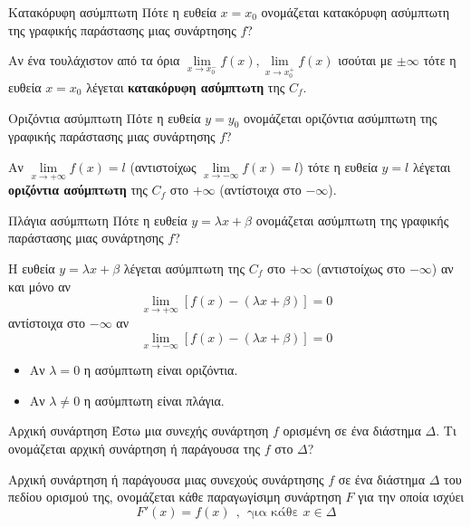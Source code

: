 \begin{Orismosbox}{Κατακόρυφη ασύμπτωτη}
\label{orismos:katakoryfh_asymptwth}
Πότε η ευθεία $x=x_0$ ονομάζεται κατακόρυφη ασύμπτωτη της γραφικής παράστασης μιας συνάρτησης $f$?
\end{Orismosbox}
\apanthsh
Αν ένα τουλάχιστον από τα όρια $ \lim\limits_{x\to x_0^-}{f(x)},\lim\limits_{x\to x_0^+}{f(x)} $ ισούται με $ \pm\infty $ τότε η ευθεία $ x=x_0 $ λέγεται \textbf{κατακόρυφη ασύμπτωτη} της $ C_f $.
\begin{Orismosbox}{Οριζόντια ασύμπτωτη}
\label{orismos:orizontia_asymptwth}
Πότε η ευθεία $y=y_0$ ονομάζεται οριζόντια ασύμπτωτη της γραφικής παράστασης μιας συνάρτησης $f$?
\end{Orismosbox}
\apanthsh
Αν $ \lim\limits_{x\to +\infty}{f(x)}=l $ (αντιστοίχως $ \lim\limits_{x\to -\infty}{f(x)}=l $) τότε η ευθεία $ y=l $ λέγεται \textbf{οριζόντια ασύμπτωτη} της $ C_f $ στο $ +\infty $ (αντίστοιχα στο $ -\infty $).
\begin{Orismosbox}{Πλάγια ασύμπτωτη}
\label{orismos:plagia_asymptwth}
Πότε η ευθεία $y=\lambda x+\beta$ ονομάζεται ασύμπτωτη της γραφικής παράστασης μιας συνάρτησης $f$?
\end{Orismosbox}
\apanthsh
Η ευθεία $ y=\lambda x+\beta $ λέγεται ασύμπτωτη της $ C_f $ στο $ +\infty $ (αντιστοίχως στο $ -\infty $) αν και μόνο αν
\[ \lim\limits_{x\to +\infty}{[f(x)-(\lambda x+\beta)]=0} \]
αντίστοιχα στο $ -\infty $ αν 
\[ \lim_{x\to -\infty}{[f(x)-(\lambda x+\beta)]=0} \]
\begin{itemize}[itemsep=0mm]
\item Αν $ \lambda=0 $ η ασύμπτωτη είναι οριζόντια.
\item Αν $ \lambda\neq 0 $ η ασύμπτωτη είναι πλάγια.
\end{itemize}
\begin{Orismosbox}{Αρχική συνάρτηση}
\label{orismos:arxikh_synarthsh}
Έστω μια συνεχής συνάρτηση $f$ ορισμένη σε ένα διάστημα $\Delta$. Τι ονομάζεται αρχική συνάρτηση ή παράγουσα της $f$ στο $\Delta$?
\end{Orismosbox}
\apanthsh
Αρχική συνάρτηση ή παράγουσα μιας συνεχούς συνάρτησης $f$ σε ένα διάστημα $\varDelta$ του πεδίου ορισμού της, ονομάζεται κάθε παραγωγίσιμη συνάρτηση $F$ για την οποία ισχύει
\[ F'(x)=f(x)\ \ ,\ \ \text{για κάθε }x\in\varDelta \]

